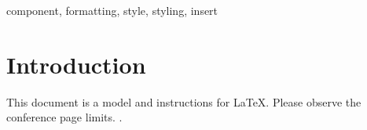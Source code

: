 \documentclass[conference]{IEEEtran}
\begin{document}




\begin{IEEEkeywords}
    component, formatting, style, styling, insert
\end{IEEEkeywords}

\section{Introduction}
This document is a model and instructions for \LaTeX.
Please observe the conference page limits.
\cite{tortinhas}.




\printglossary[type=main,style=altlist,title=Glossário]
\printglossary[type=acronym,style=altlist,title=Lista de Abreviaturas e Siglas]
\end{document}
